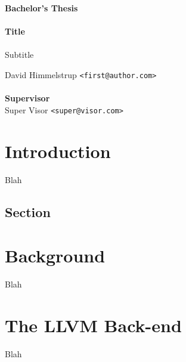 \documentclass[a4paper,oneside]{memoir}
\begin{document}
    \thispagestyle{empty}
    \begin{adjustwidth}{-3cm}{-1.5cm}
    \vspace*{-1cm}
    \textbf{\Huge Bachelor's Thesis} \\
    \vspace*{2.5cm} \\
    \textbf{\Huge Title} \\
    \vspace*{.1cm} \\
    {\huge Subtitle} \\
    \begin{tabbing}
    David Himmelstrup \hspace{1cm} \= \texttt{<first@author.com>} \\
    \\[12cm]
    \textbf{\Large Supervisor} \\
    Super Visor \> \texttt{<super@visor.com>} \\
    \end{tabbing}
    \end{adjustwidth}
    \newpage
    \ClearWallPaper

\tableofcontents*

\chapter{Introduction}
Blah
\section{Section}

\chapter{Background}
Blah

\chapter{The LLVM Back-end}
Blah
\end{document}
